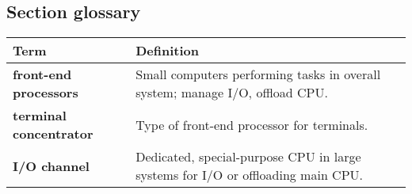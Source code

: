 \subsection{Section glossary}
\begin{tabular}{p{}p{}}
    \toprule
    \textbf{Term} & \textbf{Definition} \\
    \midrule
    \textbf{front-end processors} & Small computers performing tasks in overall system; manage I/O, offload CPU. \\
    \textbf{terminal concentrator} & Type of front-end processor for terminals. \\
    \textbf{I/O channel} & Dedicated, special-purpose CPU in large systems for I/O or offloading main CPU. \\
    \bottomrule
\end{tabular}
